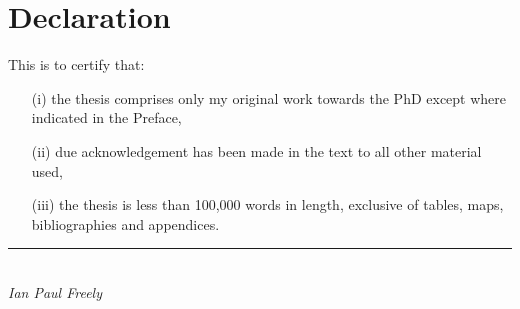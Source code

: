%
%
\chapter*{Declaration} %
This is to certify that:
\begin{itemize}
\item[(i)] the thesis comprises only my original work towards the PhD except where indicated in the Preface,
\item[(ii)] due acknowledgement has been made in the text to all other material used,
\item[(iii)] the thesis is less than 100,000 words in length, exclusive of tables, maps, bibliographies and appendices.
\end{itemize}
\vspace{3cm}
\rule{70mm}{0.1mm}\\
\emph{Ian Paul Freely} %
\cleardoublepage
%